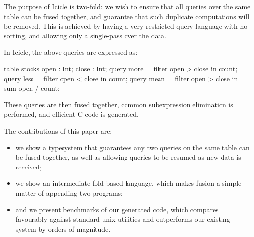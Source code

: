The purpose of Icicle is two-fold: we wish to ensure that all queries over the same table can be fused together, and guarantee that such duplicate computations will be removed.
This is achieved by having a very restricted query language with no sorting, and allowing only a single-pass over the data.

In Icicle, the above queries are expressed as:
\begin{code}
table stocks { open : Int; close : Int; }
query more = filter open > close in count;
query less = filter open < close in count;
query mean = filter open > close in sum open / count;
\end{code}

These queries are then fused together, common subexpression elimination is performed, and efficient C code is generated.

The contributions of this paper are:
\begin{itemize}
\item
we show a typesystem that guarantees any two queries on the same table can be fused together, as well as allowing queries to be resumed as new data is received;

\item
we show an intermediate fold-based language, which makes fusion a simple matter of appending two programs;

\item
and we present benchmarks of our generated code, which compares favourably against standard unix utilities and outperforms our existing system by orders of magnitude.
\end{itemize}
